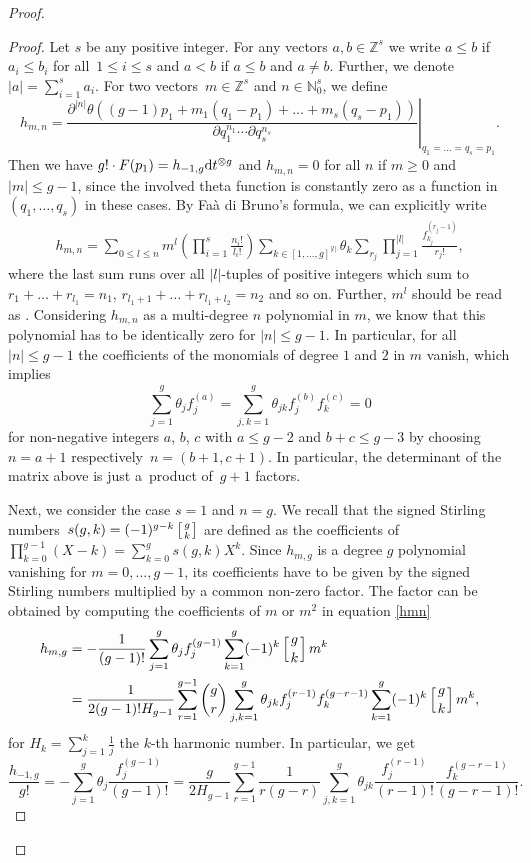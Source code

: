 \documentclass[10pt,a4paper]{amsart}
\numberwithin{equation}{section}
\newcommand\gf[2]{\genfrac{}{}{0pt}{}{#1}{#2}}
\begin{document}
\begin{proof}
\begin{proof}
		Let $s$ be any positive integer. For any vectors $a,b\in \mathbb{Z}^s$ we write $a\le b$ if $a_i\le b_i$ for all~${1\le i\le s}$ and $a<b$ if $a\le b$ and $a\neq b$. Further, we denote $|a|=\sum_{i=1}^sa_i$. For two vectors~${m\in \mathbb{Z}^s}$ and $n\in\mathbb{N}_0^s$, we define
		\[h_{m,n}=\left.\frac{\partial^{|n|}\theta((g-1)p_1+m_1(q_1-p_{1})+\dots+m_s(q_s-p_{1}))}{\partial q_1^{n_1}\cdots\partial q_s^{n_s}}\right|_{q_1=\dots=q_s=p_{1}}.\]
		Then we have $g!\cdot F(p_1)=h_{-1,g}{\rm d}t^{\otimes g}$ and $h_{m,n}=0$ for all $n$ if $m\ge 0$ and $|m|\le g-1$, since the involved theta function is constantly zero as a function in $(q_1,\dots,q_s)$ in these cases. By Fa\`a di Bruno's formula, we can explicitly write
		\begin{align}\label{hmn}
			h_{m,n}=\sum_{0\le l\le n} m^l\left(\prod_{i=1}^s\frac{n_i!}{l_i!}\right)\sum_{k\in [1,\dots,g]^{|l|}}\theta_k\sum_{r_j}\prod_{j=1}^{|l|}\frac{f_{k_j}^{(r_{j}-1)}}{r_{j}!},
		\end{align}
		where the last sum runs over all $|l|$-tuples of positive integers  which sum to $r_{1}+\dots+r_{l_1}=n_1$, $r_{l_1+1}+\dots+r_{l_1+l_2}=n_2$ and so on. Further, $m^l$ should be read as . Considering $h_{m,n}$ as a multi-degree $n$ polynomial in $m$, we know that this polynomial has to be identically zero for $|n|\le g-1$. In particular, for all $|n|\le g-1$ the coefficients of the monomials of degree $1$ and $2$ in $m$ vanish, which implies
		\[\sum_{j=1}^g\theta_jf_j^{(a)}=\sum_{j,k=1}^g\theta_{jk}f_j^{(b)}f_k^{(c)}=0\]
		for non-negative integers $a$, $b$, $c$ with $a\le g-2$ and $b+c\le g-3$ by choosing ${n=a+1}$ respectively~${n=(b+1,c+1)}$.
		In particular, the determinant of the matrix above is just a~product of~${g+1}$ factors.
		
		Next, we consider the case $s=1$ and $n=g$. We recall that the signed Stirling numbers~${s(g,k)=(-1)^{g-k}\left[\gf{g}{k}\right]}$ are defined as the coefficients of $\prod_{k=0}^{g-1}(X-k)=\sum_{k=0}^g s(g,k)X^k$. Since $h_{m,g}$ is a degree $g$ polynomial vanishing for $m=0,\dots,g-1$, its coefficients have to be given by the signed Stirling numbers multiplied by a common non-zero factor. The factor can be obtained by computing the coefficients of $m$ or $m^2$ in equation \eqref{hmn}
		\begin{align*}
			h_{m,g}&=-\frac{1}{(g-1)!}\sum_{j=1}^g\theta_jf_j^{(g-1)}\sum_{k=1}^g (-1)^{k} \left[\gf{g}{k}\right] m^k\\
			&=\frac{1}{2(g-1)!H_{g-1}}\sum_{r=1}^{g-1}\binom{g}{r}\sum_{j,k=1}^g\theta_{jk}f_j^{(r-1)}f_k^{(g-r-1)}\sum_{k=1}^g (-1)^{k} \left[\gf{g}{k}\right] m^k,
		\end{align*}
		for $H_{k}=\sum_{j=1}^{k}\frac{1}{j}$ the $k$-th harmonic number.
		In particular, we get \[\frac{h_{-1,g}}{g!}=-\sum_{j=1}^g\theta_j\frac{f_j^{(g-1)}}{(g-1)!}=\frac{g}{2H_{g-1}}\sum_{r=1}^{g-1}\frac{1}{r(g-r)}\sum_{j,k=1}^g\theta_{jk}\frac{f_j^{(r-1)}}{(r-1)!}\frac{f_k^{(g-r-1)}}{(g-r-1)!}.\]
		

\end{proof}
\end{proof}
\end{document}
